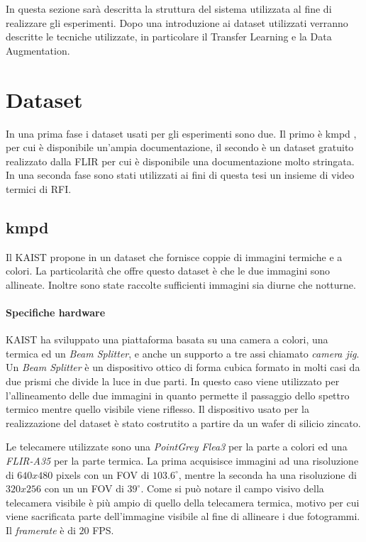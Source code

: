 \label{chap:sistema}
In questa sezione sarà descritta la struttura del sistema utilizzata al fine di realizzare gli esperimenti. Dopo una introduzione ai dataset utilizzati verranno descritte le tecniche utilizzate, in particolare il Transfer Learning e la Data Augmentation. 
\section{Dataset}
\label{sec:dataset}
In una prima fase i dataset usati per gli esperimenti sono due. Il primo è \ac{kmpd} \cite{DBLP:conf/cvpr/HwangPKCK15}, 
per cui è disponibile un'ampia documentazione, il secondo è un dataset gratuito realizzato dalla FLIR \cite{FLIRAdas} per cui è disponibile una documentazione molto stringata. In una seconda fase sono stati utilizzati ai fini di questa tesi un insieme di video termici di \ac{RFI}.
\subsection{\acl{kmpd}}
\label{subsec:kmpd}
Il \ac{KAIST} propone in \cite{DBLP:conf/cvpr/HwangPKCK15} un dataset che fornisce coppie di immagini termiche e a colori. La particolarità che offre questo dataset è che le due immagini sono allineate. Inoltre sono state raccolte sufficienti immagini sia diurne che notturne.
\paragraph{Specifiche hardware}
\ac{KAIST} ha sviluppato una piattaforma basata su una camera a colori, una termica ed un \textit{Beam Splitter}, e anche un supporto a tre assi chiamato \textit{camera jig}. Un \textit{Beam Splitter} è un dispositivo ottico di forma cubica formato in molti casi da due prismi che divide la luce in due parti. In questo caso viene utilizzato per l'allineamento delle due immagini in quanto permette il passaggio dello spettro termico mentre quello visibile viene riflesso. Il dispositivo usato per la realizzazione del dataset è stato costrutito a partire da un wafer di silicio zincato.

Le telecamere utilizzate sono una \textit{PointGrey Flea3} per la parte a colori ed una \textit{FLIR-A35} per la parte termica. La prima acquisisce immagini ad una risoluzione di $640 x 480$ pixels con un \ac{FOV} di $103.6^\circ$, mentre la seconda ha una risoluzione di $320 x 256$ con un un \ac{FOV} di $39^\circ$. Come si può notare il campo visivo della telecamera visibile è più ampio di quello della telecamera termica, motivo per cui viene sacrificata parte dell'immagine visibile al fine di allineare i due fotogrammi. Il \textit{framerate} è di $20$ FPS.


